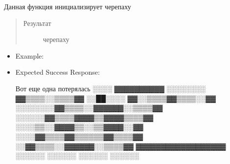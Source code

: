 \documentclass[a4paper,10pt,russian]{sphinxmanual}
\begin{document}
\begin{fulllineitems}
\label{\detokenize{index:display.create_turtle}}
\pysigstartsignatures
{}
\pysigstopsignatures
\sphinxAtStartPar
{}

\sphinxAtStartPar
Данная функция инициализирует черепаху
\begin{quote}\begin{description}
\item[{Результат}] \leavevmode
\sphinxAtStartPar
черепаху

\end{description}\end{quote}
\begin{itemize}
\item {} 
\sphinxAtStartPar
Example:

\begin{sphinxVerbatim}[commandchars=\\\{\}]
   
\end{sphinxVerbatim}

\item {} 
\sphinxAtStartPar
Expected Success Response:

\begin{sphinxVerbatim}[commandchars=\\\{\}]
Вот еще одна потерялась
\PYGZhy{}\PYGZhy{}░░░░        ▓▓▓▓▓▓▓▓▓▓      
░░░░░░░░    ▓▓▒▒▒▒░░▒▒▒▒▓▓    
░░██░░░░  ▓▓░░▒▒▒▒▓▓▒▒▒▒░░▓▓  
░░░░░░░░▓▓▒▒▒▒░░▓▓▓▓▓▓░░▒▒▒▒▓▓
\PYGZhy{}\PYGZhy{}░░░░░░▓▓▒▒▒▒▓▓▓▓▒▒▓▓▓▓▒▒▒▒▓▓
\PYGZhy{}\PYGZhy{}\PYGZhy{}\PYGZhy{}░░░░▒▒░░▓▓▓▓▒▒░░▒▒▓▓▓▓░░▓▓
\PYGZhy{}\PYGZhy{}\PYGZhy{}\PYGZhy{}░░░░▓▓▒▒▒▒▓▓▒▒▒▒▒▒▓▓▒▒▒▒▓▓
\PYGZhy{}\PYGZhy{}\PYGZhy{}\PYGZhy{}\PYGZhy{}\PYGZhy{}░░▓▓▒▒▒▒░░▓▓▓▓▓▓░░▒▒▒▒▓▓
\PYGZhy{}\PYGZhy{}\PYGZhy{}\PYGZhy{}\PYGZhy{}\PYGZhy{}\PYGZhy{}\PYGZhy{}\PYGZhy{}▓▓▓▓▓▓▓▓▓▓▓▓▓▓▓▓▓▓  
\PYGZhy{}\PYGZhy{}\PYGZhy{}\PYGZhy{}\PYGZhy{}\PYGZhy{}\PYGZhy{}\PYGZhy{}\PYGZhy{}░░░░░░      ░░░░░░  
\PYGZhy{}\PYGZhy{}\PYGZhy{}\PYGZhy{}\PYGZhy{}\PYGZhy{}\PYGZhy{}\PYGZhy{}\PYGZhy{}░░░░░░      ░░░░░░ 
\end{sphinxVerbatim}

\end{itemize}

\end{fulllineitems}

\end{document}
